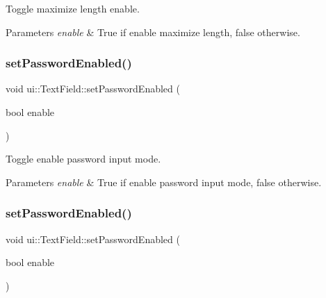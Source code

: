 Toggle maximize length enable. 


\begin{DoxyParams}{Parameters}
{\em enable} & True if enable maximize length, false otherwise. \\
\hline
\end{DoxyParams}
\mbox{\label{classui_1_1TextField_a9d20b87cd9307d0e5bcf5fa5c86d1c19}} 
\subsubsection{\texorpdfstring{set\+Password\+Enabled()}{setPasswordEnabled()}\hspace{0.1cm}{\footnotesize\ttfamily [1/2]}}
{\footnotesize\ttfamily void ui\+::\+Text\+Field\+::set\+Password\+Enabled (\begin{DoxyParamCaption}\item[{bool}]{enable }\end{DoxyParamCaption})}



Toggle enable password input mode. 


\begin{DoxyParams}{Parameters}
{\em enable} & True if enable password input mode, false otherwise. \\
\hline
\end{DoxyParams}
\mbox{\label{classui_1_1TextField_a9d20b87cd9307d0e5bcf5fa5c86d1c19}} 
\subsubsection{\texorpdfstring{set\+Password\+Enabled()}{setPasswordEnabled()}\hspace{0.1cm}{\footnotesize\ttfamily [2/2]}}
{\footnotesize\ttfamily void ui\+::\+Text\+Field\+::set\+Password\+Enabled (\begin{DoxyParamCaption}\item[{bool}]{enable }\end{DoxyParamCaption})}



